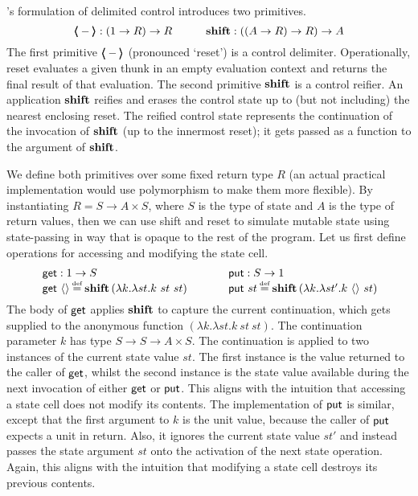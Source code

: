 \documentclass[12pt,phd,lfcs,twoside,openright,logo,leftchapter,normalheadings]{infthesis}
\theoremstyle{plain}
\theoremstyle{definition}
\begin{document}
\citeauthor{DanvyF89}'s formulation of delimited control introduces
two primitives.
%
\[
  \pmb{\langle} - \pmb{\rangle} : (1 \to R) \to R \qquad\quad
  \mathbf{shift} : ((A \to R) \to R) \to A
\]
%
The first primitive $\pmb{\langle} - \pmb{\rangle}$ (pronounced `reset') is a control
delimiter. Operationally, reset evaluates a given thunk in an empty
evaluation context and returns the final result of that evaluation.
%
The second primitive $\mathbf{shift}$ is a control reifier. An application
$\mathbf{shift}$ reifies and erases the control state up to (but not
including) the nearest enclosing reset. The reified control state
represents the continuation of the invocation of $\mathbf{shift}$ (up to the
innermost reset); it gets passed as a function to the argument of
$\mathbf{shift}$.

We define both primitives over some fixed return type $R$ (an actual
practical implementation would use polymorphism to make them more
flexible).
%
By instantiating $R = S \to A \times S$, where $S$ is the type of
state and $A$ is the type of return values, then we can use shift and
reset to simulate mutable state using state-passing in way that is
opaque to the rest of the program.
%
Let us first define operations for accessing and modifying the state
cell.
%
\[
  \ba{@{~}l@{\qquad\quad}@{~}r}
  \multirow{2}{*}{
    \bl
      \getF : \UnitType \to S\\
      \getF~\Unit \defas \shift\,(\lambda k.\lambda st. k~st~st)
    \el} &
  \multirow{2}{*}{
    \bl
      \putF : S \to \UnitType\\
      \putF~st \defas \shift\,(\lambda k.\lambda st'.k~\Unit~st)
    \el} \\ & %
  \ea
\]
%
The body of $\mathsf{get}$ applies $\mathbf{shift}$ to capture the current
continuation, which gets supplied to the anonymous function
$(\lambda k.\lambda st. k~st~st)$. The continuation parameter $k$ has
type $S \to S \to A \times S$. The continuation is applied to two
instances of the current state value $st$. The first instance is the
value returned to the caller of $\mathsf{get}$, whilst the second instance is
the state value available during the next invocation of either $\mathsf{get}$
or $\mathsf{put}$. This aligns with the intuition that accessing a state cell
does not modify its contents. The implementation of $\mathsf{put}$ is
similar, except that the first argument to $k$ is the unit value,
because the caller of $\mathsf{put}$ expects a unit in return. Also, it
ignores the current state value $st'$ and instead passes the state
argument $st$ onto the activation of the next state operation. Again,
this aligns with the intuition that modifying a state cell destroys
its previous contents.
\end{document}
